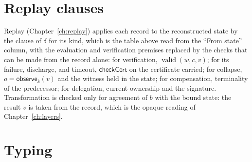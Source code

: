 \documentclass[11pt,openany]{book}
\theoremstyle{remark}
\newcommand{\valid}{\operatorname{valid}}
\begin{document}
\section{Replay clauses}

Replay (Chapter~\ref{ch:replay}) applies each record to the reconstructed
state by the clause of $\delta$ for its kind, which is the table above
read from the ``From state'' column, with the evaluation and verification
premises replaced by the checks that can be made from the record alone:
for verification, $\valid(w,c,v)$; for its failure, discharge, and
timeout, $\mathsf{checkCert}$ on the certificate carried; for collapse,
$o=\mathsf{observe}_k(v)$ and the witness held in the state; for
compensation, terminality of the predecessor; for delegation, current
ownership and the signature. Transformation is checked only for agreement
of $b$ with the bound state: the result $v$ is taken from the record,
which is the opaque reading of Chapter~\ref{ch:layers}.

\section{Typing}
\end{document}
